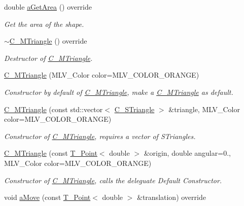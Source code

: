 \begin{DoxyCompactItemize}
double \hyperlink{classC__MTriangle_a1baff5085fc1b9822987e3fc307550ce}{a\+Get\+Area} () override
\begin{DoxyCompactList}\small\item\em Get the area of the shape. \end{DoxyCompactList}\item 
\hyperlink{classC__MTriangle_afec9368409c7a8bfd03cd0e735e1eee7}{$\sim$\+C\+\_\+\+M\+Triangle} () override
\begin{DoxyCompactList}\small\item\em Destructor of \hyperlink{classC__MTriangle}{C\+\_\+\+M\+Triangle}. \end{DoxyCompactList}\item 
\hyperlink{classC__MTriangle_ae9ead057d38f3e16948825353c5e31d6}{C\+\_\+\+M\+Triangle} (M\+L\+V\+\_\+\+Color color=M\+L\+V\+\_\+\+C\+O\+L\+O\+R\+\_\+\+O\+R\+A\+N\+GE)
\begin{DoxyCompactList}\small\item\em Constructor by default of \hyperlink{classC__MTriangle}{C\+\_\+\+M\+Triangle}, make a \hyperlink{classC__MTriangle}{C\+\_\+\+M\+Triangle} as default. \end{DoxyCompactList}\item 
\hyperlink{classC__MTriangle_a1a628c318d5b8982d5efa904e105ce10}{C\+\_\+\+M\+Triangle} (const std\+::vector$<$ \hyperlink{classC__STriangle}{C\+\_\+\+S\+Triangle} $>$ \&triangle, M\+L\+V\+\_\+\+Color color=M\+L\+V\+\_\+\+C\+O\+L\+O\+R\+\_\+\+O\+R\+A\+N\+GE)
\begin{DoxyCompactList}\small\item\em Constructor of \hyperlink{classC__MTriangle}{C\+\_\+\+M\+Triangle}, requires a vector of S\+Triangles. \end{DoxyCompactList}\item 
\hyperlink{classC__MTriangle_a5a8ffada7ee743f463304b1093394404}{C\+\_\+\+M\+Triangle} (const \hyperlink{classT__Point}{T\+\_\+\+Point}$<$ double $>$ \&origin, double angular=0., M\+L\+V\+\_\+\+Color color=M\+L\+V\+\_\+\+C\+O\+L\+O\+R\+\_\+\+O\+R\+A\+N\+GE)
\begin{DoxyCompactList}\small\item\em Constructor of \hyperlink{classC__MTriangle}{C\+\_\+\+M\+Triangle}, calls the deleguate Default Constructor. \end{DoxyCompactList}\item 
void \hyperlink{classC__MTriangle_a4e185345e7e1ffd5c0b7f1f8dfdbdc59}{a\+Move} (const \hyperlink{classT__Point}{T\+\_\+\+Point}$<$ double $>$ \&translation) override

\end{DoxyCompactItemize}
